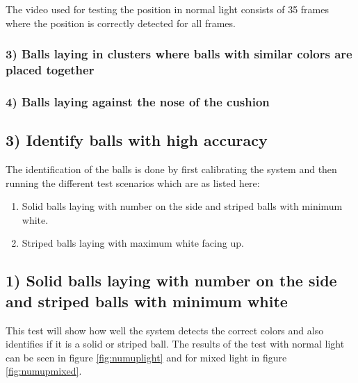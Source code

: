 The video used for testing the position in normal light consists of 35 frames where the position is correctly detected for all frames.

\subsubsection{ 3) Balls laying in clusters where balls with similar colors are placed together}


\subsubsection{ 4) Balls laying against the nose of the cushion}


\subsection{3) Identify balls with high accuracy}

The identification of the balls is done by first calibrating the system and then running the different test scenarios which are as listed here:

\begin{enumerate}
\setlength{\itemsep}{0mm}
	\item Solid balls laying with number on the side and striped balls with minimum white.\\
	\item Striped balls laying with maximum white facing up.\\	
\end{enumerate}

\subsection{1) Solid balls laying with number on the side and striped balls with minimum white}
This test will show how well the system detects the correct colors and also identifies if it is a solid or striped ball. The results of the test with normal light can be seen in figure \ref{fig:numuplight} and for mixed light in figure \ref{fig:numupmixed}.

